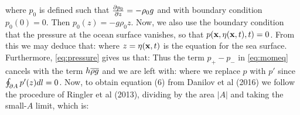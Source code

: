 \documentclass[10pt]{article}
\begin{document}
where $p_{0}$ is defined such that $\frac{\partial p_{0}}{\partial z} = -\rho_{0}g$ and with boundary condition $p_{0}(0) = 0$. Then $p_{0}(z) = -g\rho_{0}z$. Now, we also use the boundary condition that the pressure at the ocean surface vanishes, so that $p(\mathbf{x},\eta(\mathbf{x},t), t) = 0$. From this we may deduce that:
where $z = \eta(\mathbf{x},t)$ is the equation for the sea surface. \\
\linebreak
Furthermore, \cref{eq:pressure} gives us that:
Thus the term $p_{+} - p_{-}$ in \cref{eq:momeq} cancels with the term $h\overline{\rho g}$ and we are left with:
where we replace $p$ with $p'$ since $\oint_{\partial A} p'(z) dl = 0$.
Now, to obtain equation (6) from Danilov et al (2016) we follow the procedure of Ringler et al (2013), dividing by the area $|A|$ and taking the small-$A$ limit, which is:
\end{document}
